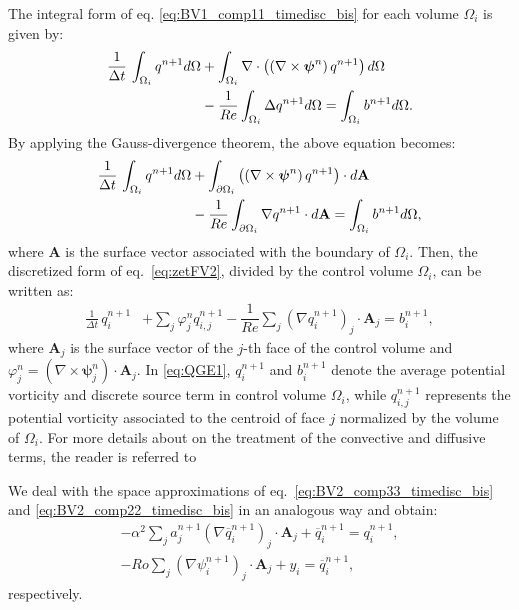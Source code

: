 \documentclass[11pt,a4paper]{article}
\begin{document}
The integral form of eq. \eqref{eq:BV1_comp11_timedisc_bis} for each volume $\Omega_i$ is given by:
\begin{align}%
\frac{1}{\Delta t}\, \int_{\Omega_i} q^{n+1} d\Omega &+ \int_{\Omega_i} \div \left(\left(\nabla \times \bm{\psi}^{n}\right) q^{n+1}\right)  d\Omega \cl
&- \dfrac{1}{Re} \int_{\Omega_i} \Delta q^{n+1} d\Omega 
= \int_{\Omega_i}b^{n+1} d\Omega. \el
\end{align}
By applying the Gauss-divergence theorem, the above equation becomes:
\begin{align}\label{eq:zetFV2}
\frac{1}{\Delta t}\, \int_{\Omega_i} q^{n+1} d\Omega &+  \int_{\partial \Omega_i} \left(\left(\nabla \times \mbox{\boldmath{$\psi$}}^{n}\right) q^{n+1}\right) \cdot d\textbf{A} \nonumber \\
&- \dfrac{1}{Re}\int_{\partial \Omega_i} \nabla q^{n+1} \cdot d\textbf{A}  = \int_{\Omega_i}b^{n+1} d\Omega, 
\end{align}
where $\textbf{A}$ is the surface vector associated with the boundary 
of $\Omega_i$.
Then, the discretized form of eq.~\eqref{eq:zetFV2}, divided by the control volume 
$\Omega_i$, can be written as:
\begin{align}
\frac{1}{\Delta t}\, q^{n+1}_i &+ \sum_j^{} \varphi^n_j q^{n+1}_{i,j} - \dfrac{1}{Re} \sum_j^{} (\nabla q^{n+1}_i)_j \cdot \textbf{A}_j  = b^{n+1}_i, \label{eq:QGE1}
\end{align}
where $\textbf{A}_j$ is the surface vector of the $j$-th face of the control volume and
$\varphi^n_j = \left(\nabla \times \bm{\psi}_j^{n}\right) \cdot \textbf{A}_j$. 
In \eqref{eq:QGE1}, $q^{n+1}_i$ and $b^{n+1}_i$ denote the average potential vorticity
and discrete source term in control volume $\Omega_i$, while $q^{n+1}_{i,j}$
represents the potential vorticity associated to the centroid of face $j$ normalized by the volume of $\Omega_i$. 
For more details about on the treatment of the convective and diffusive terms, 
the reader is referred to \cite{Girfoglio2019, GirfoglioPSIZETA}

We deal with the space approximations of eq.~\eqref{eq:BV2_comp33_timedisc_bis} and \eqref{eq:BV2_comp22_timedisc_bis}  
in an analogous way and obtain:
\begin{align}%
-\alpha^2 \sum_j a_j^{n+1} \left(\nabla\overline{q}_i^{n+1}\right)_j \cdot \textbf{A}_j + \overline{q}_i^{n+1} = q_i^{n+1}, \label{eq:QGE2}\\
  - Ro \sum_j \left(\nabla\psi_i^{n+1}\right)_j \cdot \textbf{A}_j + y_i = \overline{q}_i^{n+1} \label{eq:QGE3},
\end{align}
respectively.
\end{document}
